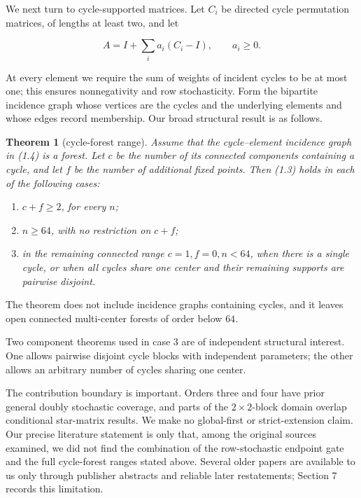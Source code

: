 \documentclass[11pt]{article}
\newtheorem{theorem}{Theorem}[section]
\begin{document}
We next turn to cycle-supported matrices.  Let $C_i$ be directed cycle
permutation matrices, of lengths at least two, and let

\[
A=I+\sum_i a_i(C_i-I), \qquad a_i\ge0. \tag{1.4}
\]

At every element we require the sum of weights of incident cycles to be at most one;
this ensures nonnegativity and row stochasticity.  Form the bipartite incidence graph
whose vertices are the cycles and the underlying elements and whose edges record
membership.  Our broad structural result is as follows.

\Needspace{0.18\textheight}
\begin{theorem}[cycle-forest range]

Assume that the cycle--element incidence graph in (1.4) is a forest.  Let $c$ be
the number of its connected components containing a cycle, and let $f$ be the number
of additional fixed points.  Then (1.3) holds in each of the following cases:

\begin{enumerate}
\item $c+f\ge2$, for every $n$;
\item $n\ge64$, with no restriction on $c+f$;
\item in the remaining connected range $c=1,f=0,n<64$, when there is a single cycle,
   or when all cycles share one center and their remaining supports are pairwise
   disjoint.
\end{enumerate}

\end{theorem}

The theorem does not include incidence graphs containing cycles, and it leaves open
connected multi-center forests of order below $64$.

Two component theorems used in case 3 are of independent structural interest.  One
allows pairwise disjoint cycle blocks with independent parameters; the other allows
an arbitrary number of cycles sharing one center.

The contribution boundary is important.  Orders three and four have prior general
doubly stochastic coverage, and parts of the $2\times2$-block domain overlap
conditional star-matrix results.  We make no global-first or strict-extension claim.
Our precise literature statement is only that, among the original sources examined,
we did not find the combination of the row-stochastic endpoint gate and the full
cycle-forest ranges stated above.  Several older papers are available to us only
through publisher abstracts and reliable later restatements; Section 7 records this
limitation.
\end{document}
